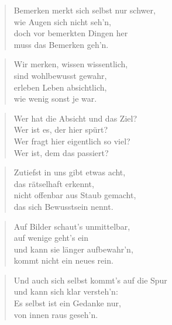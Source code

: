 \documentclass[10pt,a4paper]{article}
\begin{document}
\begin{paracol}{2}
\begin{verse}
Bemerken merkt sich selbst nur schwer, \\
wie Augen sich nicht seh’n, \\
doch vor bemerkten Dingen her \\
muss das Bemerken geh’n. \\
\end{verse}

\begin{verse}
Wir merken, wissen wissentlich, \\
sind wohlbewusst gewahr, \\
erleben Leben absichtlich, \\
wie wenig sonst je war. \\
\end{verse}

\begin{verse}
Wer hat die Absicht und das Ziel? \\
Wer ist es, der hier spürt? \\
Wer fragt hier eigentlich so viel? \\
Wer ist, dem das passiert? \\
\end{verse}

\begin{verse}
Zutiefst in uns gibt etwas acht, \\
das rätselhaft erkennt, \\
nicht offenbar aus Staub gemacht, \\
das sich Bewusstsein nennt. \\
\end{verse}

\begin{verse}
Auf Bilder schaut’s unmittelbar, \\
auf wenige geht’s ein \\
und kann sie länger aufbewahr’n, \\
kommt nicht ein neues rein. \\
\end{verse}

\begin{verse}
Und auch sich selbst kommt’s auf die Spur \\
und kann sich klar versteh’n: \\
Es selbst ist ein Gedanke nur, \\
von innen raus geseh’n. \\
\end{verse}


\end{paracol}
\end{document}
